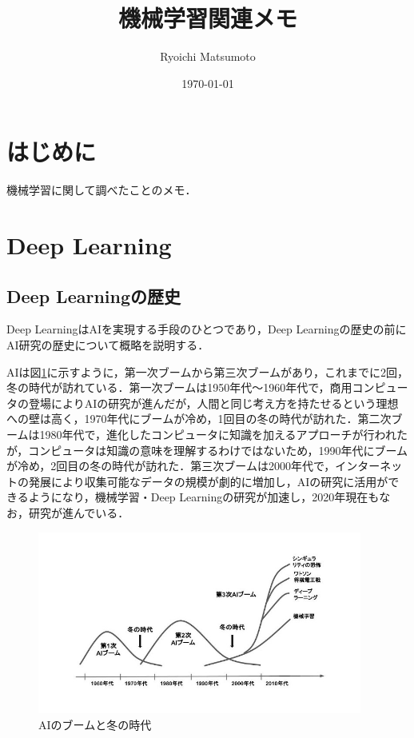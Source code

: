 \documentclass[11pt,a4paper]{jsarticle}
\title{機械学習関連メモ}
\author{Ryoichi Matsumoto}
\date{\today}
\begin{document}
\maketitle
%
%
\tableofcontents
\listoftables
\listoffigures
%
%

\section{はじめに}
機械学習に関して調べたことのメモ．

\section{Deep Learning}

\subsection{Deep Learningの歴史}

Deep LearningはAIを実現する手段のひとつであり，Deep Learningの歴史の前にAI研究の歴史について概略を説明する．\cite{dl_hist1} \cite{dl_hist2}

AIは図\ref{ai_hist_jpg}に示すように，第一次ブームから第三次ブームがあり，これまでに2回，冬の時代が訪れている．第一次ブームは1950年代～1960年代で，商用コンピュータの登場によりAIの研究が進んだが，人間と同じ考え方を持たせるという理想への壁は高く，1970年代にブームが冷め，1回目の冬の時代が訪れた．第二次ブームは1980年代で，進化したコンピュータに知識を加えるアプローチが行われたが，コンピュータは知識の意味を理解するわけではないため，1990年代にブームが冷め，2回目の冬の時代が訪れた．第三次ブームは2000年代で，インターネットの発展により収集可能なデータの規模が劇的に増加し，AIの研究に活用ができるようになり，機械学習・Deep Learningの研究が加速し，2020年現在もなお，研究が進んでいる．

\begin{figure}
	\begin{center}
		\includegraphics[height=6cm, bb=0 0 160 104]{data/figure/ai_hist.jpg}
		\caption{AIのブームと冬の時代}
		\label{ai_hist_jpg}
	\end{center}
\end{figure}
\end{document}
